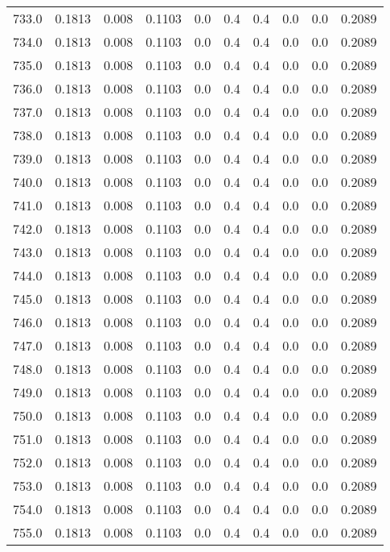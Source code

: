 \begin{longtable}{lrrrrrrrrr}
733.0 & 0.1813 & 0.008 & 0.1103 & 0.0 & 0.4 & 0.4 & 0.0 & 0.0 & 0.2089 \\
734.0 & 0.1813 & 0.008 & 0.1103 & 0.0 & 0.4 & 0.4 & 0.0 & 0.0 & 0.2089 \\
735.0 & 0.1813 & 0.008 & 0.1103 & 0.0 & 0.4 & 0.4 & 0.0 & 0.0 & 0.2089 \\
736.0 & 0.1813 & 0.008 & 0.1103 & 0.0 & 0.4 & 0.4 & 0.0 & 0.0 & 0.2089 \\
737.0 & 0.1813 & 0.008 & 0.1103 & 0.0 & 0.4 & 0.4 & 0.0 & 0.0 & 0.2089 \\
738.0 & 0.1813 & 0.008 & 0.1103 & 0.0 & 0.4 & 0.4 & 0.0 & 0.0 & 0.2089 \\
739.0 & 0.1813 & 0.008 & 0.1103 & 0.0 & 0.4 & 0.4 & 0.0 & 0.0 & 0.2089 \\
740.0 & 0.1813 & 0.008 & 0.1103 & 0.0 & 0.4 & 0.4 & 0.0 & 0.0 & 0.2089 \\
741.0 & 0.1813 & 0.008 & 0.1103 & 0.0 & 0.4 & 0.4 & 0.0 & 0.0 & 0.2089 \\
742.0 & 0.1813 & 0.008 & 0.1103 & 0.0 & 0.4 & 0.4 & 0.0 & 0.0 & 0.2089 \\
743.0 & 0.1813 & 0.008 & 0.1103 & 0.0 & 0.4 & 0.4 & 0.0 & 0.0 & 0.2089 \\
744.0 & 0.1813 & 0.008 & 0.1103 & 0.0 & 0.4 & 0.4 & 0.0 & 0.0 & 0.2089 \\
745.0 & 0.1813 & 0.008 & 0.1103 & 0.0 & 0.4 & 0.4 & 0.0 & 0.0 & 0.2089 \\
746.0 & 0.1813 & 0.008 & 0.1103 & 0.0 & 0.4 & 0.4 & 0.0 & 0.0 & 0.2089 \\
747.0 & 0.1813 & 0.008 & 0.1103 & 0.0 & 0.4 & 0.4 & 0.0 & 0.0 & 0.2089 \\
748.0 & 0.1813 & 0.008 & 0.1103 & 0.0 & 0.4 & 0.4 & 0.0 & 0.0 & 0.2089 \\
749.0 & 0.1813 & 0.008 & 0.1103 & 0.0 & 0.4 & 0.4 & 0.0 & 0.0 & 0.2089 \\
750.0 & 0.1813 & 0.008 & 0.1103 & 0.0 & 0.4 & 0.4 & 0.0 & 0.0 & 0.2089 \\
751.0 & 0.1813 & 0.008 & 0.1103 & 0.0 & 0.4 & 0.4 & 0.0 & 0.0 & 0.2089 \\
752.0 & 0.1813 & 0.008 & 0.1103 & 0.0 & 0.4 & 0.4 & 0.0 & 0.0 & 0.2089 \\
753.0 & 0.1813 & 0.008 & 0.1103 & 0.0 & 0.4 & 0.4 & 0.0 & 0.0 & 0.2089 \\
754.0 & 0.1813 & 0.008 & 0.1103 & 0.0 & 0.4 & 0.4 & 0.0 & 0.0 & 0.2089 \\
755.0 & 0.1813 & 0.008 & 0.1103 & 0.0 & 0.4 & 0.4 & 0.0 & 0.0 & 0.2089 \\

\end{longtable}
